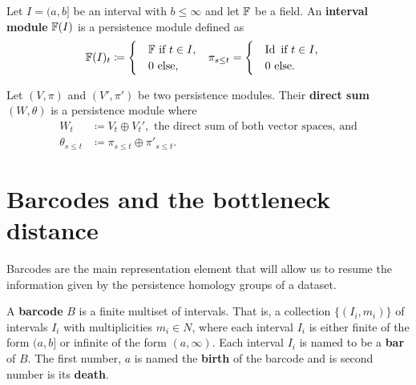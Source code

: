 \begin{definition}
    Let $ I = (a, b] $ be an interval with $ b \leq \infty $ and let $ \mathbb F $ be a field. An {\bf interval module} $\mathbb F(I)$ is a persistence module defined as
    \begin{align}
        & \mathbb F(I)_t \coloneq \begin{cases}
            &\mathbb F \text{ if } t \in I, \\
            &0 \text{ else}, 
        \end{cases}
        &
        & \pi_{s \leq t} = \begin{cases}
            & \operatorname{Id} \text{ if } t \in I, \\
            &0 \text{ else}.
        \end{cases}
    \end{align}
\end{definition}

\begin{definition}
    Let $ (V, \pi) $ and $ (V', \pi') $ be two persistence modules. Their {\bf direct sum} $ (W, \theta) $ is a persistence module where
    \begin{align}
        W_t &\coloneq V_t \oplus V_t', \text{ the direct sum of both vector spaces, and} \\
        \theta_{s \leq t} &\coloneq \pi_{s \leq t} \oplus \pi'_{s \leq t}.
    \end{align}
\end{definition}

\section{Barcodes and the bottleneck distance} \label{sec:preliminaries-barcodes}

Barcodes are the main representation element that will allow us to resume the information given by the persistence homology groups of a dataset.

\begin{definition}[Barcode]
    A {\bf barcode} $B$ is a finite multiset of intervals. That is, a collection $\{(I_i, m_i)\}$ of intervals $I_i$ with multiplicities $m_i \in N$, where each interval $ I_i $ is either finite of the form $(a, b]$ or infinite of the form $(a, \infty)$. Each interval $I_i$ is named to be a {\bf bar} of $B$. The first number, $ a $ is named the {\bf birth} of the barcode and is second number is its {\bf death}.
\end{definition}

